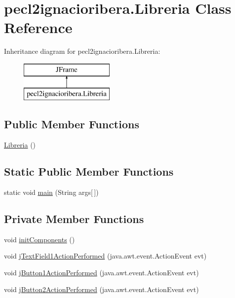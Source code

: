 \hypertarget{classpecl2ignacioribera_1_1_libreria}{}\section{pecl2ignacioribera.\+Libreria Class Reference}
\label{classpecl2ignacioribera_1_1_libreria}
Inheritance diagram for pecl2ignacioribera.\+Libreria\+:\begin{figure}[H]
\begin{center}
\leavevmode
\includegraphics[height=2.000000cm]{classpecl2ignacioribera_1_1_libreria}
\end{center}
\end{figure}
\subsection*{Public Member Functions}
\begin{DoxyCompactItemize}
\item 
\mbox{\hyperlink{classpecl2ignacioribera_1_1_libreria_afb8a78e297254074dcc5c35d5c5e00e9}{Libreria}} ()
\end{DoxyCompactItemize}
\subsection*{Static Public Member Functions}
\begin{DoxyCompactItemize}
\item 
static void \mbox{\hyperlink{classpecl2ignacioribera_1_1_libreria_aa1ad2e8aa0d79bee9ab29d4c49cd9a64}{main}} (String args\mbox{[}$\,$\mbox{]})
\end{DoxyCompactItemize}
\subsection*{Private Member Functions}
\begin{DoxyCompactItemize}
\item 
void \mbox{\hyperlink{classpecl2ignacioribera_1_1_libreria_adda6fd1643fbeda1d0ebc88a286fe093}{init\+Components}} ()
\item 
void \mbox{\hyperlink{classpecl2ignacioribera_1_1_libreria_a31071a27ba4d6f5ff758be176fc744f1}{j\+Text\+Field1\+Action\+Performed}} (java.\+awt.\+event.\+Action\+Event evt)
\item 
void \mbox{\hyperlink{classpecl2ignacioribera_1_1_libreria_a9ecfee92a566b51546110c242da8ff2a}{j\+Button1\+Action\+Performed}} (java.\+awt.\+event.\+Action\+Event evt)
\item 
void \mbox{\hyperlink{classpecl2ignacioribera_1_1_libreria_ab8cd51249b59ff462fef7822d230c92b}{j\+Button2\+Action\+Performed}} (java.\+awt.\+event.\+Action\+Event evt)
\end{DoxyCompactItemize}
